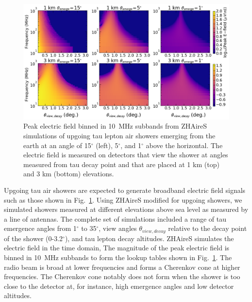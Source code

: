 \documentclass{PoS}
\begin{document}
\begin{figure}[htbp]
\begin{center}
\includegraphics[width=\textwidth]{figures/efield_sims_mountainonly_logscale}
\caption{Peak electric field binned in 10~MHz subbands from ZHAireS simulations of upgoing tau lepton air showers emerging from the earth at an angle of 15$^{\circ}$ (left), 5$^{\circ}$, and 1$^{\circ}$ above the horizontal. The electric field is measured on detectors that view the shower at angles measured from tau decay point and that are placed at 1 km (top) and 3 km (bottom) elevations. }
\label{fig:efield}
\end{center}
\end{figure}

Upgoing tau air showers are expected to generate broadband electric field signals such as those shown in Fig.~\ref{fig:efield}. Using ZHAireS modified for upgoing showers, we simulated showers measured at different elevations above sea level as measured by a line of antennas. The complete set of simulations included a range of tau emergence angles from 1$^{\circ}$ to 35$^{\circ}$, view angles $\theta_{view,decay}$ relative to the decay point of the shower (0-3.2$^{\circ}$), and tau lepton decay altitudes. ZHAireS simulates the electric field in the time domain, The magnitude of the peak electric field is binned in 10~MHz subbands to form the lookup tables shown in  Fig.~\ref{fig:efield}. The radio beam is broad at lower frequencies and forms a Cherenkov cone at higher frequencies. The Cherenkov cone notably does not form when the shower is too close to the detector at, for instance, high emergence angles and low detector altitudes. 

\end{document}
